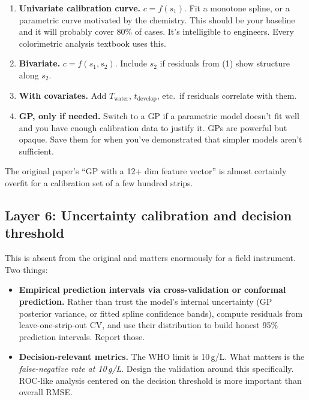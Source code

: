 \documentclass[11pt,letterpaper]{article}
\begin{document}
\begin{enumerate}
  \item \textbf{Univariate calibration curve.} $c = f(s_1)$. Fit a monotone
    spline, or a parametric curve motivated by the chemistry. This should
    be your baseline and it will probably cover 80\% of cases. It's
    intelligible to engineers. Every colorimetric analysis textbook uses
    this.
  \item \textbf{Bivariate.} $c = f(s_1, s_2)$. Include $s_2$ if residuals
    from (1) show structure along $s_2$.
  \item \textbf{With covariates.} Add $T_{\text{water}}$, $t_{\text{develop}}$,
    etc.\ if residuals correlate with them.
  \item \textbf{GP, only if needed.} Switch to a GP if a parametric model
    doesn't fit well and you have enough calibration data to justify it.
    GPs are powerful but opaque. Save them for when you've demonstrated
    that simpler models aren't sufficient.
\end{enumerate}

The original paper's ``GP with a 12+ dim feature vector'' is almost
certainly overfit for a calibration set of a few hundred strips.

\subsection*{Layer 6: Uncertainty calibration and decision threshold}

This is absent from the original and matters enormously for a field
instrument. Two things:

\begin{itemize}
  \item \textbf{Empirical prediction intervals via cross-validation or
    conformal prediction.} Rather than trust the model's internal
    uncertainty (GP posterior variance, or fitted spline confidence bands),
    compute residuals from leave-one-strip-out CV, and use their
    distribution to build honest 95\% prediction intervals. Report those.
  \item \textbf{Decision-relevant metrics.} The WHO limit is 10\,\textmu g/L.
    What matters is the \emph{false-negative rate at 10\,\textmu g/L}.
    Design the validation around this specifically. ROC-like analysis
    centered on the decision threshold is more important than overall RMSE.
\end{itemize}

\end{document}
